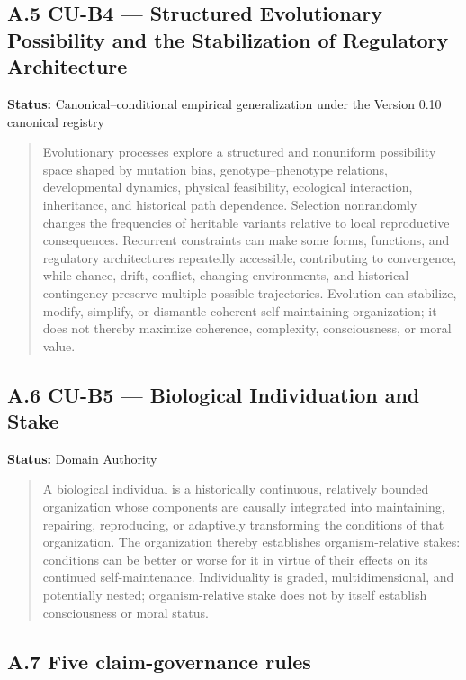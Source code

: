 \documentclass[
  11pt,
]{article}
\begin{document}
\subsection{A.5 CU-B4 --- Structured Evolutionary Possibility and the
Stabilization of Regulatory
Architecture}\label{a.5-cu-b4-structured-evolutionary-possibility-and-the-stabilization-of-regulatory-architecture}

\textbf{Status:} Canonical--conditional empirical generalization under
the Version 0.10 canonical registry

\begin{quote}
Evolutionary processes explore a structured and nonuniform possibility
space shaped by mutation bias, genotype--phenotype relations,
developmental dynamics, physical feasibility, ecological interaction,
inheritance, and historical path dependence. Selection nonrandomly
changes the frequencies of heritable variants relative to local
reproductive consequences. Recurrent constraints can make some forms,
functions, and regulatory architectures repeatedly accessible,
contributing to convergence, while chance, drift, conflict, changing
environments, and historical contingency preserve multiple possible
trajectories. Evolution can stabilize, modify, simplify, or dismantle
coherent self-maintaining organization; it does not thereby maximize
coherence, complexity, consciousness, or moral value.
\end{quote}

\subsection{A.6 CU-B5 --- Biological Individuation and
Stake}\label{a.6-cu-b5-biological-individuation-and-stake}

\textbf{Status:} Domain Authority

\begin{quote}
A biological individual is a historically continuous, relatively bounded
organization whose components are causally integrated into maintaining,
repairing, reproducing, or adaptively transforming the conditions of
that organization. The organization thereby establishes
organism-relative stakes: conditions can be better or worse for it in
virtue of their effects on its continued self-maintenance. Individuality
is graded, multidimensional, and potentially nested; organism-relative
stake does not by itself establish consciousness or moral status.
\end{quote}

\subsection{A.7 Five claim-governance
rules}\label{a.7-five-claim-governance-rules}
\end{document}
